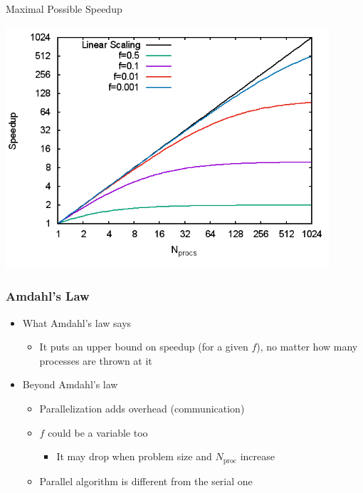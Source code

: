 \documentclass[10pt,t]{beamer}
\begin{document}
\begin{frame}{Maximal Possible Speedup}
\begin{center}
\includegraphics[width=0.9\textwidth]{./amdahl}
\end{center}
\end{frame}

\begin{frame}
\frametitle{Amdahl's Law}
\begin{itemize}
\item What Amdahl's law says
\begin{itemize}
\item It puts an upper bound on speedup (for a given $f$), no matter how many processes are thrown at it
\end{itemize}
\item Beyond Amdahl's law
\begin{itemize}
\item Parallelization adds overhead (communication)
\item $f$ could be a variable too
\begin{itemize}
\item It may drop when problem size and $N_\mathrm{proc}$ increase
\end{itemize}
\item Parallel algorithm is different from the serial one
\end{itemize}
\end{itemize}
\end{frame}
\end{document}

